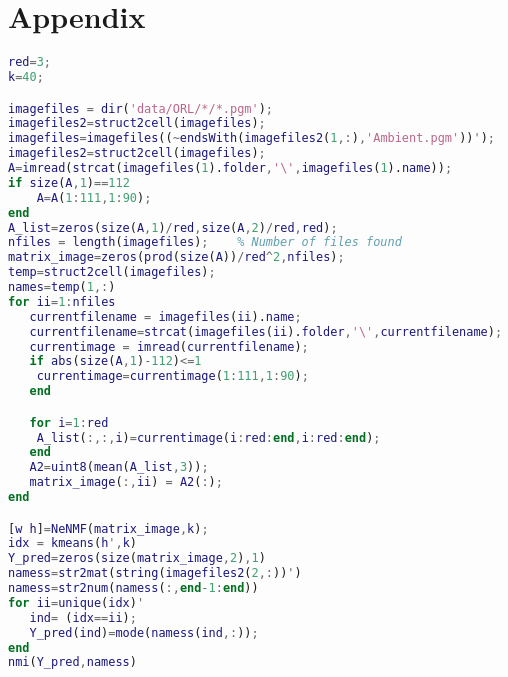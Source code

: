 \appendix
\section{Appendix}
\begin{lstlisting}[language=Matlab,caption=The Levenberg--Marquardt algorithm iteratively finds optimal macroscale Robin boundary conditions., label=matn1]
%A=imread('C:\Users\chenc\OneDrive - UNSW\machine learning\assignment 1\data\CroppedYaleB\yaleB01\yaleB01_P00A+000E+00.pgm');
red=3;
k=40;

imagefiles = dir('data/ORL/*/*.pgm');
imagefiles2=struct2cell(imagefiles);
imagefiles=imagefiles((~endsWith(imagefiles2(1,:),'Ambient.pgm'))');
imagefiles2=struct2cell(imagefiles);
A=imread(strcat(imagefiles(1).folder,'\',imagefiles(1).name));
if size(A,1)==112
    A=A(1:111,1:90);
end
A_list=zeros(size(A,1)/red,size(A,2)/red,red);
nfiles = length(imagefiles);    % Number of files found
matrix_image=zeros(prod(size(A))/red^2,nfiles);
temp=struct2cell(imagefiles);
names=temp(1,:)
for ii=1:nfiles
   currentfilename = imagefiles(ii).name;
   currentfilename=strcat(imagefiles(ii).folder,'\',currentfilename);
   currentimage = imread(currentfilename);
   if abs(size(A,1)-112)<=1
    currentimage=currentimage(1:111,1:90);
   end

   for i=1:red
    A_list(:,:,i)=currentimage(i:red:end,i:red:end);
   end
   A2=uint8(mean(A_list,3));
   matrix_image(:,ii) = A2(:);
end

[w h]=NeNMF(matrix_image,k);
idx = kmeans(h',k)
Y_pred=zeros(size(matrix_image,2),1)
namess=str2mat(string(imagefiles2(2,:))')
namess=str2num(namess(:,end-1:end))
for ii=unique(idx)'
   ind= (idx==ii);
   Y_pred(ind)=mode(namess(ind,:));
end
nmi(Y_pred,namess)
\end{lstlisting}

